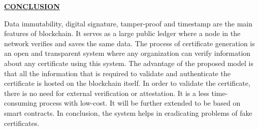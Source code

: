 
\begin{center}
    \underline{\bfseries \huge CONCLUSION}\\
    \vspace{1cm}
    \end{center}
    \noindent Data immutability, digital signature, tamper-proof and timestamp are the main features of blockchain. It serves as a large public ledger where a node in the network verifies and saves the same data. The process of certificate generation is an open and transparent system where any organization can verify information about any certificate using this system. The advantage of the proposed model is that all the information that is required to validate and authenticate the certificate is hosted on the blockchain itself. In order to validate the certificate, there is no need for external verification or attestation. It is a less time-consuming process with low-cost. It will be further extended to be based on smart contracts. In conclusion, the system helps in eradicating problems of fake certificates.
